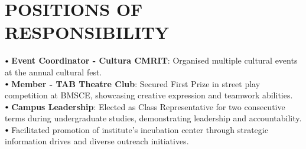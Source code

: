 \documentclass[letterpaper,8pt]{article}
\newcommand\sbullet[1][.5]{\mathbin{\vcenter{\hbox{\scalebox{#1}{$\bullet$}}}}}
\begin{document}
 \vspace{-18pt}

\section{POSITIONS OF RESPONSIBILITY}
\vspace{-1pt}

\noindent \hangindent=1.2cm $\sbullet[.75]$ \textbf{Event Coordinator - Cultura CMRIT}: Organised multiple cultural events at the annual cultural fest. \\

\noindent \hangindent=0.289cm $\sbullet[.75]$ \textbf{Member - TAB Theatre Club}: Secured First Prize in street play competition at BMSCE, showcasing creative expression and teamwork abilities. \\

\noindent \hangindent=0.289cm $\sbullet[.75]$ \textbf{Campus Leadership}: Elected as Class Representative for two consecutive terms during undergraduate studies, demonstrating leadership and accountability. \\

\noindent \hangindent=1.2cm $\sbullet[.75]$ Facilitated promotion of institute's incubation center through strategic information drives and diverse outreach initiatives. \\



\vspace{-5pt}

            



 
\end{document}
